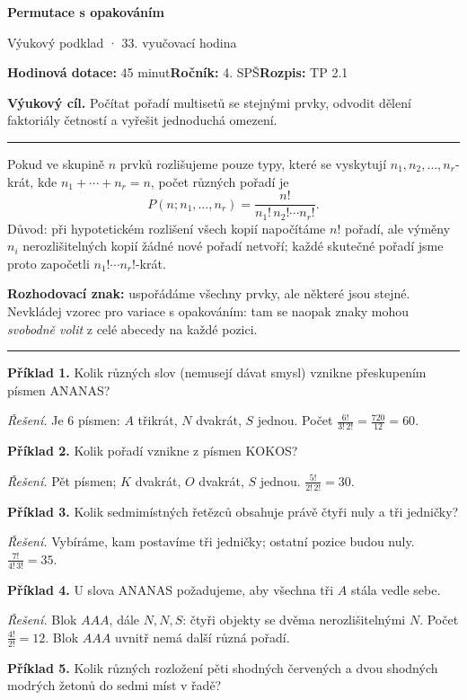 \documentclass[11pt,a4paper]{article}
\newcommand{\sect}[1]{\par\vspace{2mm}{\Large\sffamily\bfseries\color{deep} #1}\par\vspace{-0.5mm}\noindent\color{teal}\rule{\linewidth}{0.7pt}\color{black}\vspace{1mm}}
\begin{document}
{\Huge\sffamily\bfseries\color{deep} Permutace s opakováním}\par
{\sffamily\large\color{teal} Výukový podklad · 33. vyučovací hodina}\par
\textbf{Hodinová dotace:} 45 minut\quad \textbf{Ročník:} 4. SPŠ\quad \textbf{Rozpis:} TP 2.1\par
\begin{tcolorbox}[theobox]\textbf{Výukový cíl.} Počítat pořadí multisetů se stejnými prvky, odvodit dělení faktoriály četností a vyřešit jednoduchá omezení.\end{tcolorbox}
\sect{Teorie a vysvětlení}
Pokud ve skupině \(n\) prvků rozlišujeme pouze typy, které se vyskytují \(n_1,n_2,\ldots,n_r\)-krát, kde \(n_1+\cdots+n_r=n\), počet různých pořadí je
\[P(n;n_1,\ldots,n_r)=\frac{n!}{n_1!\,n_2!\cdots n_r!}.\]
Důvod: při hypotetickém rozlišení všech kopií napočítáme \(n!\) pořadí, ale výměny \(n_i\) nerozlišitelných kopií žádné nové pořadí netvoří; každé skutečné pořadí jsme proto započetli \(n_1!\cdots n_r!\)-krát.\par
\textbf{Rozhodovací znak:} uspořádáme všechny prvky, ale některé jsou stejné. Nevkládej vzorec pro variace s opakováním: tam se naopak znaky mohou \emph{svobodně volit} z celé abecedy na každé pozici.
\sect{Řešené příklady}
\textbf{Příklad 1.} Kolik různých slov (nemusejí dávat smysl) vznikne přeskupením písmen \textsc{ANANAS}?\par
\textit{Řešení.} Je \(6\) písmen: \(A\) třikrát, \(N\) dvakrát, \(S\) jednou. Počet \(\frac{6!}{3!\,2!}=\frac{720}{12}=60\).\par\smallskip
\textbf{Příklad 2.} Kolik pořadí vznikne z písmen \textsc{KOKOS}?\par
\textit{Řešení.} Pět písmen; \(K\) dvakrát, \(O\) dvakrát, \(S\) jednou. \(\frac{5!}{2!\,2!}=30\).\par\smallskip
\textbf{Příklad 3.} Kolik sedmimístných řetězců obsahuje právě čtyři nuly a tři jedničky?\par
\textit{Řešení.} Vybíráme, kam postavíme tři jedničky; ostatní pozice budou nuly. \(\frac{7!}{4!\,3!}=35\).\par\smallskip
\textbf{Příklad 4.} U slova \textsc{ANANAS} požadujeme, aby všechna tři \(A\) stála vedle sebe.\par
\textit{Řešení.} Blok \(AAA\), dále \(N,N,S\): čtyři objekty se dvěma nerozlišitelnými \(N\). Počet \(\frac{4!}{2!}=12\). Blok \(AAA\) uvnitř nemá další různá pořadí.\par\smallskip
\textbf{Příklad 5.} Kolik různých rozložení pěti shodných červených a dvou shodných modrých žetonů do sedmi míst v řadě?\par
\end{document}
